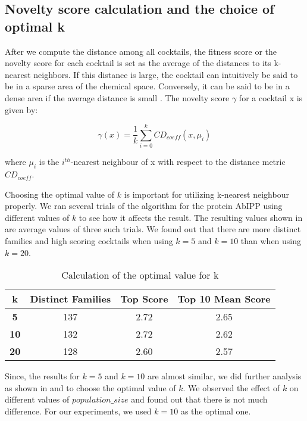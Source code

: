 \subsection{Novelty score calculation and the choice of optimal k} \label{sec:GA-fitness-k}
After we compute the distance among all cocktails, the fitness score or the novelty score for each cocktail is set as the average of the distances to its k-nearest neighbors. If this distance is large, the cocktail can intuitively be said to be in a sparse area of the chemical space. Conversely, it can be said to be in a dense area if the average distance is small \cite{Novelty}. The novelty score $\gamma$ for a cocktail x is given by:

\begin{equation}
\gamma (x) = \frac{1}{k}\sum_{i=0}^{k}CD_{coeff}(x,\mu_{i})\label{eq}
\end{equation}

\noindent
where $\mu_{i}$ is the $i^{th}$-nearest neighbour of x with respect to the distance metric \textit{$CD_{coeff}$}.

Choosing the optimal value of $k$ is important for utilizing k-nearest neighbour properly. We ran several trials of the algorithm for the protein AbIPP using different values of $k$ to see how it affects the result. The resulting values shown in  are average values of three such trials. We found out that there are more distinct families and high scoring cocktails when using $k=5$ and $k=10$ than when using $k=20$. %

\begin{table}[htbp]
\begin{center}

\caption{Calculation of the optimal value for k}
\begin{tabular}{|c|c|c|c|}
\hline
\textbf{k} & \textbf{Distinct Families} & \textbf{Top Score} & \textbf{Top 10 Mean Score}  \\
\hline
\textbf{5} & 137 & 2.72 & 2.65  \\
\hline
\textbf{10} & 132 & 2.72 &  2.62 \\
\hline
\textbf{20} & 128 & 2.60 &  2.57 \\
\hline
\end{tabular}
\label{optimal_k}

\end{center}
\end{table}

Since, the results for $k=5$ and $k=10$ are almost similar, we did further analysis as shown in  and  to choose the optimal value of $k$. We observed the effect of $k$ on  different values of $population\_size$ and found out that there is not much difference. For our experiments, we used $k=10$ as the optimal one.


